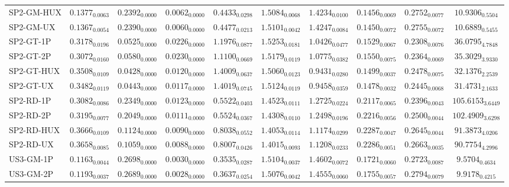 \begin{longtable}{@{}lccccccccc@{}}
SP2-GM-HUX & $0.1377_{0.0063}$ & $0.2392_{0.0000}$ & $0.0062_{0.0000}$ & $0.4433_{0.0298}$ & $1.5084_{0.0068}$ & $1.4234_{0.0100}$ & $0.1456_{0.0069}$ & $0.2752_{0.0077}$ & $10.9306_{0.5504}$ \\
SP2-GM-UX & $0.1367_{0.0054}$ & $0.2390_{0.0000}$ & $0.0060_{0.0000}$ & $0.4477_{0.0213}$ & $1.5101_{0.0042}$ & $1.4247_{0.0084}$ & $0.1450_{0.0072}$ & $0.2755_{0.0072}$ & $10.6889_{0.5455}$ \\
SP2-GT-1P & $0.3178_{0.0196}$ & $0.0525_{0.0000}$ & $0.0226_{0.0000}$ & $1.1976_{0.0877}$ & $1.5253_{0.0181}$ & $1.0426_{0.0477}$ & $0.1529_{0.0067}$ & $0.2308_{0.0076}$ & $36.0795_{4.7848}$ \\
SP2-GT-2P & $0.3072_{0.0160}$ & $0.0580_{0.0000}$ & $0.0230_{0.0000}$ & $1.1100_{0.0669}$ & $1.5179_{0.0119}$ & $1.0775_{0.0382}$ & $0.1550_{0.0075}$ & $0.2364_{0.0069}$ & $35.3029_{3.9330}$ \\
SP2-GT-HUX & $0.3508_{0.0109}$ & $0.0428_{0.0000}$ & $0.0120_{0.0000}$ & $1.4009_{0.0637}$ & $1.5060_{0.0123}$ & $0.9431_{0.0280}$ & $0.1499_{0.0037}$ & $0.2478_{0.0075}$ & $32.1376_{2.2539}$ \\
SP2-GT-UX & $0.3482_{0.0119}$ & $0.0443_{0.0000}$ & $0.0117_{0.0000}$ & $1.4019_{0.0745}$ & $1.5124_{0.0119}$ & $0.9458_{0.0359}$ & $0.1478_{0.0032}$ & $0.2445_{0.0068}$ & $31.4731_{2.1633}$ \\
SP2-RD-1P & $0.3082_{0.0086}$ & $0.2349_{0.0000}$ & $0.0123_{0.0000}$ & $0.5522_{0.0403}$ & $1.4523_{0.0111}$ & $1.2725_{0.0224}$ & $0.2117_{0.0065}$ & $0.2396_{0.0043}$ & $105.6153_{3.6449}$ \\
SP2-RD-2P & $0.3195_{0.0077}$ & $0.2049_{0.0000}$ & $0.0111_{0.0000}$ & $0.5524_{0.0367}$ & $1.4308_{0.0110}$ & $1.2498_{0.0196}$ & $0.2216_{0.0056}$ & $0.2500_{0.0044}$ & $102.4909_{3.6298}$ \\
SP2-RD-HUX & $0.3666_{0.0109}$ & $0.1124_{0.0000}$ & $0.0090_{0.0000}$ & $0.8038_{0.0552}$ & $1.4053_{0.0114}$ & $1.1174_{0.0299}$ & $0.2287_{0.0047}$ & $0.2645_{0.0044}$ & $91.3873_{4.0206}$ \\
SP2-RD-UX & $0.3658_{0.0085}$ & $0.1059_{0.0000}$ & $0.0088_{0.0000}$ & $0.8007_{0.0426}$ & $1.4015_{0.0093}$ & $1.1208_{0.0233}$ & $0.2286_{0.0051}$ & $0.2663_{0.0035}$ & $90.7754_{4.2996}$ \\
US3-GM-1P & $0.1163_{0.0044}$ & $0.2698_{0.0000}$ & $0.0030_{0.0000}$ & $0.3535_{0.0287}$ & $1.5104_{0.0037}$ & $1.4602_{0.0072}$ & $0.1721_{0.0060}$ & $0.2723_{0.0087}$ & $9.5704_{0.4634}$ \\
US3-GM-2P & $0.1193_{0.0037}$ & $0.2689_{0.0000}$ & $0.0028_{0.0000}$ & $0.3637_{0.0254}$ & $1.5076_{0.0042}$ & $1.4555_{0.0060}$ & $0.1755_{0.0057}$ & $0.2794_{0.0079}$ & $9.9178_{0.4215}$ \\

\end{longtable}
